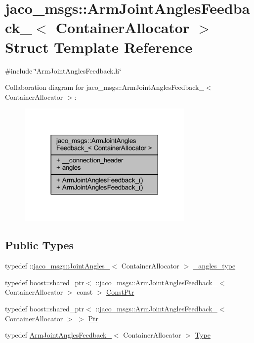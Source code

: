 \hypertarget{structjaco__msgs_1_1ArmJointAnglesFeedback__}{}\section{jaco\+\_\+msgs\+:\+:Arm\+Joint\+Angles\+Feedback\+\_\+$<$ Container\+Allocator $>$ Struct Template Reference}
\label{structjaco__msgs_1_1ArmJointAnglesFeedback__}


{\ttfamily \#include \char`\"{}Arm\+Joint\+Angles\+Feedback.\+h\char`\"{}}



Collaboration diagram for jaco\+\_\+msgs\+:\+:Arm\+Joint\+Angles\+Feedback\+\_\+$<$ Container\+Allocator $>$\+:
\nopagebreak
\begin{figure}[H]
\begin{center}
\leavevmode
\includegraphics[width=242pt]{db/d51/structjaco__msgs_1_1ArmJointAnglesFeedback____coll__graph}
\end{center}
\end{figure}
\subsection*{Public Types}
\begin{DoxyCompactItemize}
\item 
typedef \+::\hyperlink{structjaco__msgs_1_1JointAngles__}{jaco\+\_\+msgs\+::\+Joint\+Angles\+\_\+}$<$ Container\+Allocator $>$ \hyperlink{structjaco__msgs_1_1ArmJointAnglesFeedback___a629bebf796b19c402987a577a7713b39}{\+\_\+angles\+\_\+type}
\item 
typedef boost\+::shared\+\_\+ptr$<$ \+::\hyperlink{structjaco__msgs_1_1ArmJointAnglesFeedback__}{jaco\+\_\+msgs\+::\+Arm\+Joint\+Angles\+Feedback\+\_\+}$<$ Container\+Allocator $>$ const  $>$ \hyperlink{structjaco__msgs_1_1ArmJointAnglesFeedback___a6f2b04c0ed8a6cfe0463ec2bbec1ee84}{Const\+Ptr}
\item 
typedef boost\+::shared\+\_\+ptr$<$ \+::\hyperlink{structjaco__msgs_1_1ArmJointAnglesFeedback__}{jaco\+\_\+msgs\+::\+Arm\+Joint\+Angles\+Feedback\+\_\+}$<$ Container\+Allocator $>$ $>$ \hyperlink{structjaco__msgs_1_1ArmJointAnglesFeedback___a6ff881b1ba9022ce71ca77ce3dba47c8}{Ptr}
\item 
typedef \hyperlink{structjaco__msgs_1_1ArmJointAnglesFeedback__}{Arm\+Joint\+Angles\+Feedback\+\_\+}$<$ Container\+Allocator $>$ \hyperlink{structjaco__msgs_1_1ArmJointAnglesFeedback___a287c913e2d7401bf18764230c4a9e4f4}{Type}
\end{DoxyCompactItemize}
